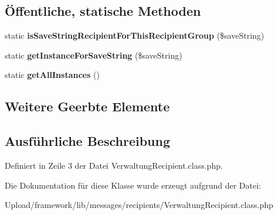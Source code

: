 \subsection*{Öffentliche, statische Methoden}
\begin{DoxyCompactItemize}
\item 
\mbox{\label{class_verwaltung_recipient_a2eb9e1f7f3c576db546ec4b1283afa06}} 
static {\bfseries is\+Save\+String\+Recipient\+For\+This\+Recipient\+Group} (\$save\+String)
\item 
\mbox{\label{class_verwaltung_recipient_a13e90f44885e6b90ecf57b44a8e3cc96}} 
static {\bfseries get\+Instance\+For\+Save\+String} (\$save\+String)
\item 
\mbox{\label{class_verwaltung_recipient_ab78e3977a3dc19017894deae00055b60}} 
static {\bfseries get\+All\+Instances} ()
\end{DoxyCompactItemize}
\subsection*{Weitere Geerbte Elemente}


\subsection{Ausführliche Beschreibung}


Definiert in Zeile 3 der Datei Verwaltung\+Recipient.\+class.\+php.



Die Dokumentation für diese Klasse wurde erzeugt aufgrund der Datei\+:\begin{DoxyCompactItemize}
\item 
Upload/framework/lib/messages/recipients/Verwaltung\+Recipient.\+class.\+php\end{DoxyCompactItemize}
